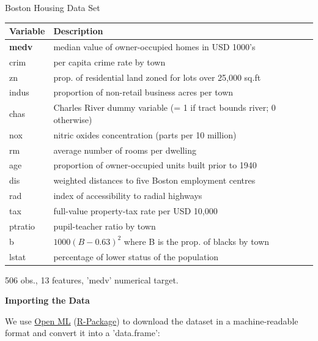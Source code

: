 \documentclass[11pt,compress,t,notes=noshow, xcolor=table]{beamer}
\begin{document}
\begin{vbframe}{Boston Housing Data Set}
\begin{table}
  \footnotesize
    \begin{tabularx}{\textwidth}{l:X}
    Variable & Description \\
    \hline
    \textbf{medv} & median value of owner-occupied homes in USD 1000's \\
    crim &	per capita crime rate by town \\
    zn & prop. of residential land zoned for lots over 25,000 sq.ft \\
    indus & proportion of non-retail business acres per town \\
    chas &	Charles River dummy variable (= 1 if tract bounds river; 0 otherwise) \\
    nox & nitric oxides concentration (parts per 10 million) \\
    rm & average number of rooms per dwelling \\
    age & proportion of owner-occupied units built prior to 1940 \\
    dis & weighted distances to five Boston employment centres \\
    rad & index of accessibility to radial highways \\
    tax & full-value property-tax rate per USD 10,000 \\
    ptratio & pupil-teacher ratio by town \\
    b & $1000(B - 0.63)^2$ where B is the prop. of blacks by town \\
    lstat & percentage of lower status of the population \\
    \end{tabularx}
\end{table}

506 obs., 13 features, 'medv' numerical target.

\framebreak

\textbf{Importing the Data}

We use \href{https://www.openml.org}{Open ML} (\href{https://cran.r-project.org/package=OpenML}{R-Package}) to download the dataset in a machine-readable format and convert it into a 'data.frame':



\end{vbframe}
\end{document}
